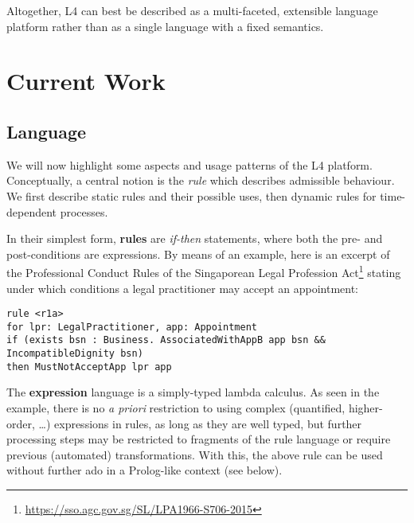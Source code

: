 \documentclass[runningheads]{llncs}
\begin{document}
Altogether, L4 can best be described as a multi-faceted, extensible language
platform rather than as a single language with a fixed semantics.

\section{Current Work}\label{sec:current_work}

\subsection{Language}\label{sec:language}

We will now highlight some aspects and usage patterns of the L4
platform. Conceptually, a central notion is the \emph{rule} which describes
admissible behaviour. We first describe static rules and their possible uses,
then dynamic rules for time-dependent processes.

In their simplest form, \textbf{rules} are \emph{if-then} statements, where both the
pre- and post-conditions are expressions. By means of an example, here is an
excerpt of the Professional Conduct Rules of the Singaporean Legal Profession
Act\footnote{\url{https://sso.agc.gov.sg/SL/LPA1966-S706-2015}} stating under
which conditions a legal practitioner may accept an appointment:

\begin{lstlisting}
rule <r1a>
for lpr: LegalPractitioner, app: Appointment
if (exists bsn : Business. AssociatedWithAppB app bsn && IncompatibleDignity bsn)
then MustNotAcceptApp lpr app
\end{lstlisting}

The \textbf{expression} language is a simply-typed lambda calculus. As seen in
the example, there is no \emph{a priori} restriction to using complex
(quantified, higher-order, \dots) expressions in rules, as long as they are
well typed, but further processing steps may be restricted to fragments of the
rule language or require previous (automated) transformations. With this, the
above rule can be used without further ado in a Prolog-like context (see
below).
\end{document}
